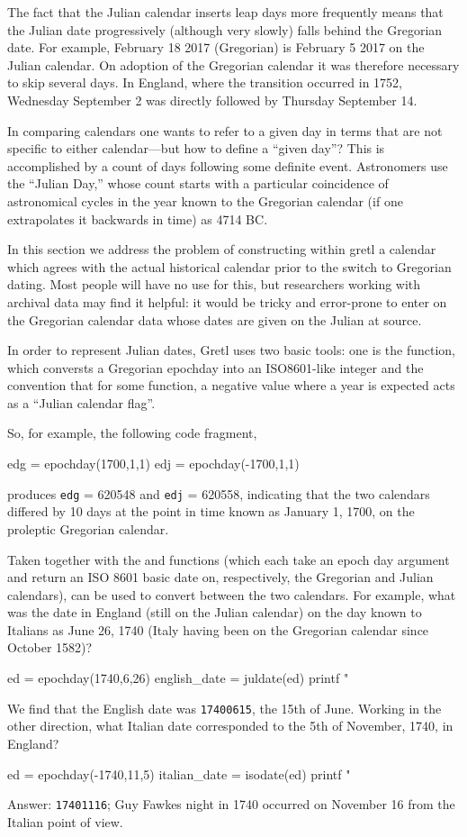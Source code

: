 The fact that the Julian calendar inserts leap days more frequently
means that the Julian date progressively (although very slowly) falls
behind the Gregorian date. For example, February 18 2017 (Gregorian)
is February 5 2017 on the Julian calendar. On adoption of the
Gregorian calendar it was therefore necessary to skip several days. In
England, where the transition occurred in 1752, Wednesday September 2
was directly followed by Thursday September 14.

In comparing calendars one wants to refer to a given day in terms that
are not specific to either calendar---but how to define a ``given
day''? This is accomplished by a count of days following some definite
event. Astronomers use the ``Julian Day,'' whose count starts with a
particular coincidence of astronomical cycles in the year known to the
Gregorian calendar (if one extrapolates it backwards in time) as 4714
BC.

In this section we address the problem of constructing within gretl a
calendar which agrees with the actual historical calendar prior to
the switch to Gregorian dating. Most people will have no use for
this, but researchers working with archival data may find it helpful:
it would be tricky and error-prone to enter on the Gregorian calendar
data whose dates are given on the Julian at source.

In order to represent Julian dates, Gretl uses two basic tools: one is
the  function, which conversts a Gregorian epochday into
an ISO8601-like integer and the convention that for some function,
a negative value where a year is expected acts as a ``Julian calendar
flag''.

So, for example, the following code fragment,
%
\begin{code}
edg = epochday(1700,1,1)
edj = epochday(-1700,1,1)
\end{code}
%
produces \texttt{edg} = 620548 and \texttt{edj} = 620558, indicating
that the two calendars differed by 10 days at the point in time
known as January 1, 1700, on the proleptic Gregorian calendar.

Taken together with the  and 
functions (which each take an epoch day argument and return an ISO
8601 basic date on, respectively, the Gregorian and Julian calendars),
 can be used to convert between the two calendars.
For example, what was the date in England (still on the Julian
calendar) on the day known to Italians as June 26, 1740 (Italy having
been on the Gregorian calendar since October 1582)?
%
\begin{code}
ed = epochday(1740,6,26)
english_date = juldate(ed)
printf "%
\end{code}
%
We find that the English date was \texttt{17400615}, the 15th of June.
Working in the other direction, what Italian date corresponded to the
5th of November, 1740, in England?
%
\begin{code}
ed = epochday(-1740,11,5)
italian_date = isodate(ed)
printf "%
\end{code}
%
Answer: \texttt{17401116}; Guy Fawkes night in 1740 occurred on 
November 16 from the Italian point of view.

